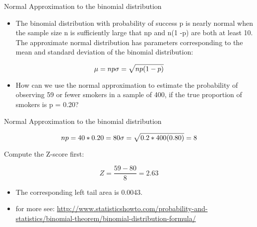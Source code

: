 \documentclass[
  ignorenonframetext,
]{beamer}
\providecommand{\tightlist}{%
  \setlength{\itemsep}{0pt}\setlength{\parskip}{0pt}}
\begin{document}
\begin{frame}{Normal Approximation to the binomial distribution}
\protect\hypertarget{normal-approximation-to-the-binomial-distribution-1}{}

\begin{itemize}
\tightlist
\item
  The binomial distribution with probability of success p is nearly
  normal when the sample size n is sufficiently large that np and n(1
  -p) are both at least 10. The approximate normal distribution has
  parameters corresponding to the mean and standard deviation of the
  binomial distribution:
\end{itemize}

\[\mu=np \\
\sigma = \sqrt{np(1-p)}\]

\begin{itemize}
\tightlist
\item
  How can we use the normal approximation to estimate the probability of
  observing 59 or fewer smokers in a sample of 400, if the true
  proportion of smokers is p = 0.20?
\end{itemize}

\end{frame}

\begin{frame}{Normal Approximation to the binomial distribution}
\protect\hypertarget{normal-approximation-to-the-binomial-distribution-2}{}

\[np = 40*0.20 = 80 \\ 
\sigma= \sqrt{0.2*400(0.80)}=8\]

Compute the Z-score first:

\[Z = \frac{59-80}{8} =  2.63\]

\begin{itemize}
\item
  The corresponding left tail area is 0.0043.
\item
  for more see:
  \url{http://www.statisticshowto.com/probability-and-statistics/binomial-theorem/binomial-distribution-formula/}
\end{itemize}

\end{frame}
\end{document}
